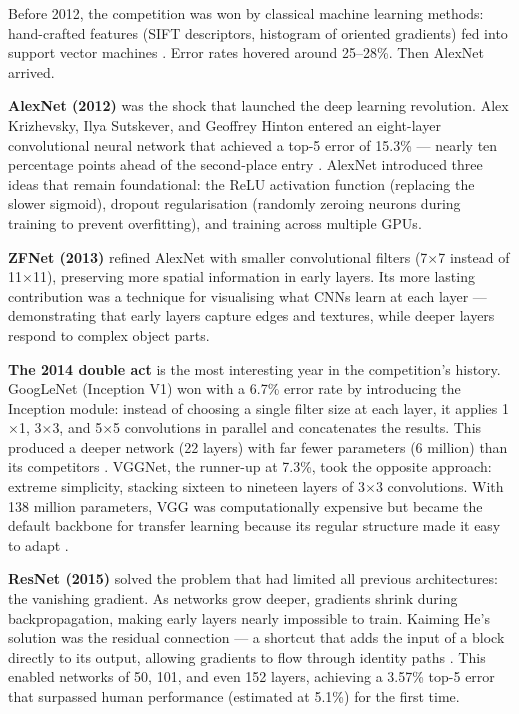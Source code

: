 Before 2012, the competition was won by classical machine learning methods: hand-crafted features (SIFT descriptors, histogram of oriented gradients) fed into support vector machines \citep{goodfellow2016deep}. Error rates hovered around 25--28\%. Then AlexNet arrived.

\textbf{AlexNet (2012)} was the shock that launched the deep learning revolution. Alex Krizhevsky, Ilya Sutskever, and Geoffrey Hinton entered an eight-layer convolutional neural network that achieved a top-5 error of 15.3\% --- nearly ten percentage points ahead of the second-place entry \citep{krizhevsky2012imagenet}. AlexNet introduced three ideas that remain foundational: the ReLU activation function (replacing the slower sigmoid), dropout regularisation (randomly zeroing neurons during training to prevent overfitting), and training across multiple GPUs.

\textbf{ZFNet (2013)} refined AlexNet with smaller convolutional filters (7$\times$7 instead of 11$\times$11), preserving more spatial information in early layers. Its more lasting contribution was a technique for visualising what CNNs learn at each layer --- demonstrating that early layers capture edges and textures, while deeper layers respond to complex object parts.

\textbf{The 2014 double act} is the most interesting year in the competition's history. GoogLeNet (Inception V1) won with a 6.7\% error rate by introducing the Inception module: instead of choosing a single filter size at each layer, it applies 1$\times$1, 3$\times$3, and 5$\times$5 convolutions in parallel and concatenates the results. This produced a deeper network (22 layers) with far fewer parameters (6 million) than its competitors \citep{szegedy2015going}. VGGNet, the runner-up at 7.3\%, took the opposite approach: extreme simplicity, stacking sixteen to nineteen layers of 3$\times$3 convolutions. With 138 million parameters, VGG was computationally expensive but became the default backbone for transfer learning because its regular structure made it easy to adapt \citep{simonyan2014deep}.

\textbf{ResNet (2015)} solved the problem that had limited all previous architectures: the vanishing gradient. As networks grow deeper, gradients shrink during backpropagation, making early layers nearly impossible to train. Kaiming He's solution was the residual connection --- a shortcut that adds the input of a block directly to its output, allowing gradients to flow through identity paths \citep{he2016resnet}. This enabled networks of 50, 101, and even 152 layers, achieving a 3.57\% top-5 error that surpassed human performance (estimated at 5.1\%) for the first time.

